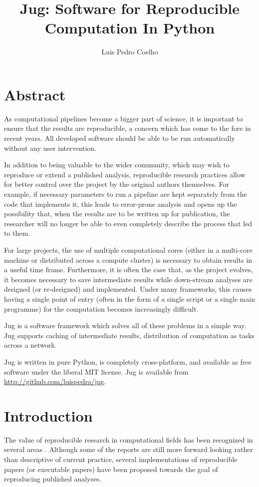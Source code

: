 \documentclass{article}
\title{Jug: Software for Reproducible Computation In Python}
\author{Luis Pedro Coelho}
\begin{document}
\maketitle

\section*{Abstract}
As computational pipelines become a bigger part of science, it is important to
ensure that the results are reproducible, a concern which has come to the fore
in recent years. All developed software should be able to be run automatically
without any user intervention.

In addition to being valuable to the wider community, which may wish to
reproduce or extend a published analysis, reproducible research practices allow
for better control over the project by the original authors themselves. For
example, if necessary parameters to run a pipeline are kept separately from the
code that implements it, this leads to error-prone analysis and opens up the
possibility that, when the results are to be written up for publication, the
researcher will no longer be able to even completely describe the process that
led to them.

For large projects, the use of multiple computational cores (either in a
multi-core machine or distributed across a compute cluster) is necessary to
obtain results in a useful time frame. Furthermore, it is often the case that,
as the project evolves, it becomes necessary to save intermediate results while
down-stream analyses are designed (or re-designed) and implemented. Under many
frameworks, this causes having a single point of entry (often in the form of a
single script or a single main programme) for the computation becomes
increasingly difficult.

Jug is a software framework which solves all of these problems in a simple way.
Jug supports caching of intermediate results, distribution of computation as
tasks across a network.

Jug is written in pure Python, is completely cross-platform, and available as
free software under the liberal MIT license. Jug is available from
\url{http://github.com/luispedro/jug}.
\bigskip
\bigskip

\section{Introduction}
The value of reproducible research in computational fields has been recognized
in several areas
\citep{donoho2009reproducible,v2009reproducible,nordlie2009towards,fomel2015reproducible,leveque2012reproducible,dudley2010reproducible}.
Although some of the reports are still more forward looking rather than
descriptive of current practice, several implementations of reproducible papers
(or executable papers) have been proposed towards the goal of reproducing
published analyses.
\end{document}
